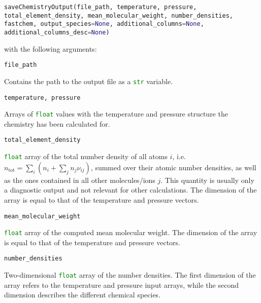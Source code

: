 \documentclass[numbers=noenddot]{aux/fcmanual}
\begin{document}
\lstinline[language=Python, breaklines, breakatwhitespace]!saveChemistryOutput(file_path, temperature, pressure, total_element_density, mean_molecular_weight, number_densities, fastchem, output_species=None, additional_columns=None, additional_columns_desc=None)!

\bigbreak

with the following arguments:

\bigbreak

\lstinline[language=Python]!file_path!
\begin{addmargin}[25pt]{0pt}
	Contains the path to the output file as a \lstinline[language=Python]!str! variable.
\end{addmargin}


\bigbreak

\lstinline[language=Python]!temperature, pressure!
\begin{addmargin}[25pt]{0pt}
	Arrays of \lstinline[language=Python]!float! values with the temperature and pressure structure the chemistry has been calculated for.
\end{addmargin}

\bigbreak

\lstinline[language=Python]!total_element_density!
\begin{addmargin}[25pt]{0pt}
	\lstinline[language=Python]!float! array of the total number density of all atoms $i$, i.e. $n_\mathrm{tot} = \sum_i \left( n_i + \sum_j n_j \nu_{ij} \right)$, summed over their atomic number densities, as well as the ones contained in all other molecules/ions $j$. This quantity is usually only a diagnostic output and not relevant for other calculations. The dimension of the array is equal to that of the temperature and pressure vectors.
\end{addmargin}

\bigbreak

\lstinline[language=Python]!mean_molecular_weight!
\begin{addmargin}[25pt]{0pt}
	\lstinline[language=Python]!float! array of the computed mean molecular weight. The dimension of the array is equal to that of the temperature and pressure vectors.
\end{addmargin}


\bigbreak

\lstinline[language=Python]!number_densities!
\begin{addmargin}[25pt]{0pt}
	Two-dimensional \lstinline[language=Python]!float! array of the number densities. The first dimension of the array refers to the temperature and pressure input arrays, while the second dimension describes the different chemical species.
\end{addmargin}
\end{document}

